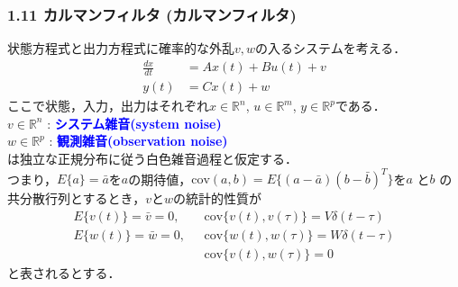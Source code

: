 \documentclass[10pt]{beamer}
\begin{document}
\begin{frame}[t]
\frametitle{1.11 カルマンフィルタ (カルマンフィルタ)}
状態方程式と出力方程式に確率的な外乱$v,w$の入るシステムを考える．
\begin{align}
 \frac{dx}{dt} &= A x(t) + B u(t) +  v  \\
 y(t) &= C x(t) + w 
\end{align}
ここで状態，入力，出力はそれぞれ$x \in {\mathbb R}^n$, $ u \in {\mathbb R}^m $, $ y \in {\mathbb R}^p $である．\\
$v \in {\mathbb R}^n$ : \textcolor{blue}{\bf システム雑音(system noise)} \\
$w \in {\mathbb R}^p$ : \textcolor{blue}{\bf 観測雑音(observation noise)} \\は独立な正規分布に従う白色雑音過程と仮定する．\\
つまり，$E\{ a \} = \bar{a} $を$a$の期待値，$\mbox{cov}(a,b) = E \{ (a-\bar{a})(b-\bar{b})^T \}$を$a$ と$b$ の共分散行列とするとき，$v$と$w$の統計的性質が
\begin{align}
     E \{ v(t) \} = \bar{v} = 0, & \ \ \ \mbox{cov}\{ v(t), v(\tau)\} = V \delta(t-\tau)
\\
     E \{ w(t) \} = \bar{w} = 0, & \ \ \ \mbox{cov}\{ w(t), w(\tau)\} = W \delta(t-\tau)
\\
                       & \ \ \ \mbox{cov} \{v(t), w(\tau) \} =0
\end{align}
と表されるとする．\\
\end{frame}
\end{document}
